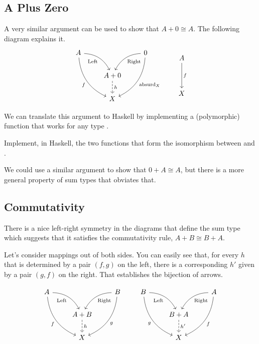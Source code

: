\documentclass[DaoFP]{subfiles}
\begin{document}
\subsection{A Plus Zero}
A very similar argument can be used to show that $A + 0 \cong A$. The following diagram explains it.
\[
 \begin{tikzcd}
 A
 \arrow[dr,  bend left, "\text{Left}"']
 \arrow[ddr, bend right, "f"']
 && 0
 \arrow[dl, bend right, "\text{Right}"]
 \arrow[ddl, bend left, "\text{absurd}_X"]
 \\
&A + 0
\arrow[d, dashed, "h"]
\\
& X
 \end{tikzcd}
 \qquad
 \begin{tikzcd}
 A
 \arrow[dd, "f"]
 \\
 \\
 X
 \end{tikzcd}
\]

We can translate this argument to Haskell by implementing a (polymorphic) function  that works for any type . 

\begin{exercise}
Implement, in Haskell, the two functions that form the isomorphism between  and .
\end{exercise}

We could use a similar argument to show that $0 + A \cong A$, but there is a more general property of sum types that obviates that.
\subsection{Commutativity}

There is a nice left-right symmetry in the diagrams that define the sum type which suggests that it satisfies the commutativity rule, $A + B \cong B + A$. 

Let's consider mappings out of both sides. You can easily see that, for every $h$ that is determined by a pair $(f, g)$ on the left, there is a corresponding $h'$ given by a pair $(g, f)$ on the right. That establishes the bijection of arrows.

\[
 \begin{tikzcd}
 A
 \arrow[dr,  bend left, "\text{Left}"']
 \arrow[ddr, bend right, "f"']
 && B
 \arrow[dl, bend right, "\text{Right}"]
 \arrow[ddl, bend left, "g"]
 \\
&A + B
\arrow[d, dashed, "h"]
\\
& X
 \end{tikzcd}
 \qquad
 \begin{tikzcd}
 B
 \arrow[dr,  bend left, "\text{Left}"']
 \arrow[ddr, bend right, "g"']
 && A
 \arrow[dl, bend right, "\text{Right}"]
 \arrow[ddl, bend left, "f"]
 \\
&B + A
\arrow[d, dashed, "h'"]
\\
& X
 \end{tikzcd}
\]
\end{document}
